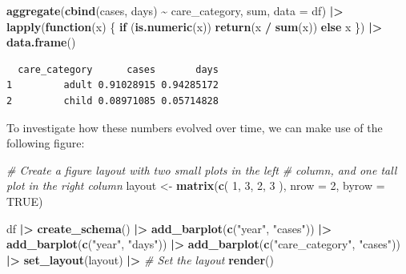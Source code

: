 \documentclass[
  openany]{book}
\newenvironment{Shaded}{\begin{snugshade}}{\end{snugshade}}
\newcommand{\AttributeTok}[1]{\textcolor[rgb]{0.13,0.29,0.53}{#1}}
\newcommand{\CommentTok}[1]{\textcolor[rgb]{0.56,0.35,0.01}{\textit{#1}}}
\newcommand{\ConstantTok}[1]{\textcolor[rgb]{0.56,0.35,0.01}{#1}}
\newcommand{\ControlFlowTok}[1]{\textcolor[rgb]{0.13,0.29,0.53}{\textbf{#1}}}
\newcommand{\DecValTok}[1]{\textcolor[rgb]{0.00,0.00,0.81}{#1}}
\newcommand{\FunctionTok}[1]{\textcolor[rgb]{0.13,0.29,0.53}{\textbf{#1}}}
\newcommand{\NormalTok}[1]{#1}
\newcommand{\OtherTok}[1]{\textcolor[rgb]{0.56,0.35,0.01}{#1}}
\newcommand{\SpecialCharTok}[1]{\textcolor[rgb]{0.81,0.36,0.00}{\textbf{#1}}}
\newcommand{\StringTok}[1]{\textcolor[rgb]{0.31,0.60,0.02}{#1}}
\theoremstyle{definition}
\theoremstyle{definition}
\theoremstyle{definition}
\theoremstyle{definition}
\theoremstyle{remark}
\begin{document}
\begin{Shaded}
\begin{Highlighting}[]
\FunctionTok{aggregate}\NormalTok{(}\FunctionTok{cbind}\NormalTok{(cases, days) }\SpecialCharTok{\textasciitilde{}}\NormalTok{ care\_category, sum, }\AttributeTok{data =}\NormalTok{ df) }\SpecialCharTok{|\textgreater{}}
  \FunctionTok{lapply}\NormalTok{(}\ControlFlowTok{function}\NormalTok{(x) \{ }\ControlFlowTok{if}\NormalTok{ (}\FunctionTok{is.numeric}\NormalTok{(x)) }\FunctionTok{return}\NormalTok{(x }\SpecialCharTok{/} \FunctionTok{sum}\NormalTok{(x)) }\ControlFlowTok{else}\NormalTok{ x \}) }\SpecialCharTok{|\textgreater{}}
  \FunctionTok{data.frame}\NormalTok{()}
\end{Highlighting}
\end{Shaded}

\begin{verbatim}
  care_category      cases       days
1         adult 0.91028915 0.94285172
2         child 0.08971085 0.05714828
\end{verbatim}

To investigate how these numbers evolved over time, we can make use of the following figure:

\begin{Shaded}
\begin{Highlighting}[]
\CommentTok{\# Create a figure layout with two small plots in the left}
\CommentTok{\# column, and one tall plot in the right column}
\NormalTok{layout }\OtherTok{\textless{}{-}} \FunctionTok{matrix}\NormalTok{(}\FunctionTok{c}\NormalTok{(}
  \DecValTok{1}\NormalTok{, }\DecValTok{3}\NormalTok{,}
  \DecValTok{2}\NormalTok{, }\DecValTok{3}
\NormalTok{), }\AttributeTok{nrow =} \DecValTok{2}\NormalTok{, }\AttributeTok{byrow =} \ConstantTok{TRUE}\NormalTok{)}

\NormalTok{df }\SpecialCharTok{|\textgreater{}}
  \FunctionTok{create\_schema}\NormalTok{() }\SpecialCharTok{|\textgreater{}}
  \FunctionTok{add\_barplot}\NormalTok{(}\FunctionTok{c}\NormalTok{(}\StringTok{"year"}\NormalTok{, }\StringTok{"cases"}\NormalTok{)) }\SpecialCharTok{|\textgreater{}}
  \FunctionTok{add\_barplot}\NormalTok{(}\FunctionTok{c}\NormalTok{(}\StringTok{"year"}\NormalTok{, }\StringTok{"days"}\NormalTok{)) }\SpecialCharTok{|\textgreater{}}
  \FunctionTok{add\_barplot}\NormalTok{(}\FunctionTok{c}\NormalTok{(}\StringTok{"care\_category"}\NormalTok{, }\StringTok{"cases"}\NormalTok{)) }\SpecialCharTok{|\textgreater{}}
  \FunctionTok{set\_layout}\NormalTok{(layout) }\SpecialCharTok{|\textgreater{}} \CommentTok{\# Set the layout}
  \FunctionTok{render}\NormalTok{() }
\end{Highlighting}
\end{Shaded}
\end{document}
